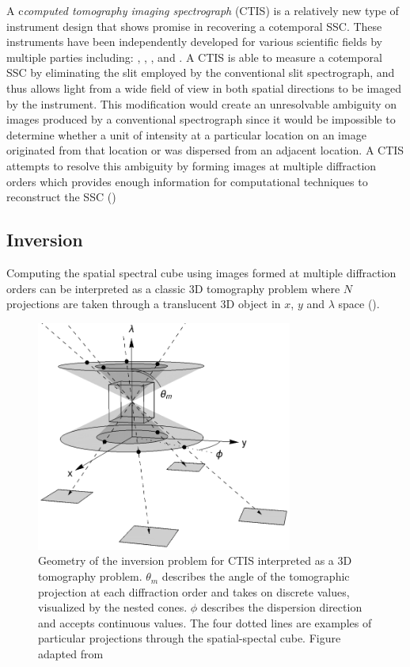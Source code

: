 \documentclass{article}
\begin{document}
			A c\textit{computed tomography imaging spectrograph} (CTIS) is a relatively new type of instrument design that shows promise in recovering a cotemporal SSC. These instruments have been independently developed for various scientific fields by multiple parties including: \cite{Okamoto:91}, \cite{bulygin:92}, \cite{Descour:95}, and \cite{kankel1}. A CTIS is able to measure a cotemporal SSC by eliminating the slit employed by the conventional slit spectrograph, and thus allows light from a wide field of view in both spatial directions to be imaged by the instrument. This modification would create an unresolvable ambiguity on images produced by a conventional spectrograph since it would be impossible to determine whether a unit of intensity at a particular location on an image originated from that location or was dispersed from an adjacent location. A CTIS attempts to resolve this ambiguity by forming images at multiple diffraction orders which provides enough information for computational techniques to reconstruct the SSC (\cite{inversion})
				
			 
		\subsection{Inversion}
			\label{inv_sec}
		
			Computing the spatial spectral cube using images formed at multiple diffraction orders can be interpreted as a classic 3D tomography problem where $N$ projections are taken through a translucent 3D object in $x$, $y$ and $\lambda$ space (\cite{Bulygin:05}).
			\begin{figure}[h!]
				\centering
				\includegraphics[width=0.75\textwidth]{figures/tomography}
				\caption{Geometry of the inversion problem for CTIS interpreted as a 3D tomography problem. $\theta_m$ describes the angle of the tomographic projection at each diffraction order and takes on discrete values, visualized by the nested cones. $\phi$ describes the dispersion direction and accepts continuous values. The four dotted lines are examples of particular projections through the spatial-spectal cube. Figure adapted from \cite{Bulygin:05}}
				\label{tomography}
			\end{figure}
			
\end{document}
